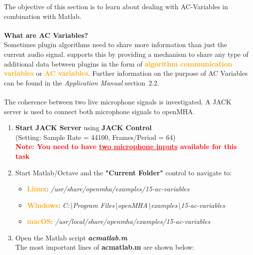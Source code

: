 \documentclass[11pt,a4paper,twoside]{article}
\newcommand{\+}{\discretionary{\mbox{\scriptsize$\hookleftarrow$}}{}{}}
\begin{document}
{{The objective of this section is to learn about dealing with AC-Variables in combination with Matlab. \\ \\

\textbf{What are AC Variables?} \\

Sometimes plugin algorithms need to share more information than just the current audio signal. \mha{} supports this by providing a mechanism to share any type of additional data between plugins in the form of \textcolor{orange}{\textbf{algorithm communication variables}} or \textcolor{orange}{\textbf{AC variables}}. Further information on the purpose of AC Variables can be found in the \textit{Application Manual} section~2.2. \\

\dotfill \\

The coherence between two live microphone signals is investigated. A JACK server is used to connect both microphone signals to openMHA.  

\begin{enumerate}

\item \textbf{Start JACK Server} using \textbf{JACK Control}\\
  (Setting: Sample Rate = 44100, Frames/Period = 64) \\
  \textcolor{red}{\textbf{Note: You need to have \underline{two microphone inputs} available for this task}}

\item Start Matlab/Octave and the \textbf{"Current Folder"} control to navigate to: 

\begin{itemize}
\item \textcolor{orange}{\textbf{Linux}}: \textit{/usr/share/openmha/examples/15-ac-variables} 
\item \textcolor{orange}{\textbf{Windows}}: \textit{C:\textbackslash Program Files\textbackslash openMHA\textbackslash examples\textbackslash 15-ac-variables}
\item \textcolor{orange}{\textbf{macOS}}: \textit{/usr/local/share/openmha/examples/15-ac-variables} 
\end{itemize}

\item Open the Matlab script \textbf{\textit{acmatlab.m}} \\

The most important lines of \textbf{acmatlab.m} are shown below:


\end{enumerate}}}
\end{document}
